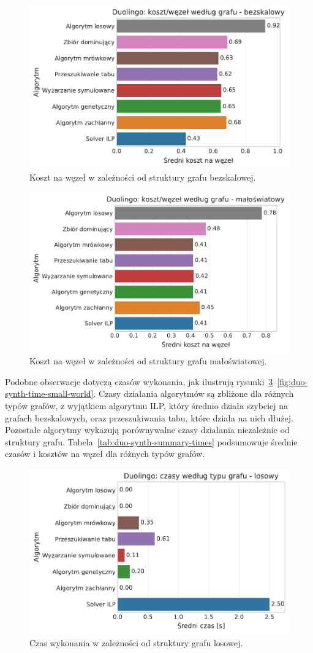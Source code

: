 \begin{figure}[H]
  \centering
  \includegraphics[width=0.65\linewidth]{assets/figures/benchmark/synthetic/duolingo_cost_per_node_by_graph_scale_free.pdf}
  \caption{Koszt na węzeł w zależności od struktury grafu bezskalowej.}
  \label{fig:duo-synth-cost-scale-free}
\end{figure}

\begin{figure}[H]
  \centering
  \includegraphics[width=0.65\linewidth]{assets/figures/benchmark/synthetic/duolingo_cost_per_node_by_graph_small_world.pdf}
  \caption{Koszt na węzeł w zależności od struktury grafu małoświatowej.}
  \label{fig:duo-synth-cost-small-world}
\end{figure}

Podobne obserwacje dotyczą czasów wykonania, jak ilustrują rysunki~\ref{fig:duo-synth-time-random}--\ref{fig:duo-synth-time-small-world}. Czasy działania algorytmów są zbliżone dla różnych typów grafów, z wyjątkiem algorytmu ILP, który średnio działa szybciej na grafach bezskalowych, oraz przeszukiwania tabu, które działa na nich dłużej. Pozostałe algorytmy wykazują porównywalne czasy działania niezależnie od struktury grafu. Tabela~\ref{tab:duo-synth-summary-times} podsumowuje średnie czasów i kosztów na węzeł dla różnych typów grafów.

\begin{figure}[H]
  \centering
  \includegraphics[width=0.65\linewidth]{assets/figures/benchmark/synthetic/duolingo_time_by_graph_random.pdf}
  \caption{Czas wykonania w zależności od struktury grafu losowej.}
  \label{fig:duo-synth-time-random}
\end{figure}

